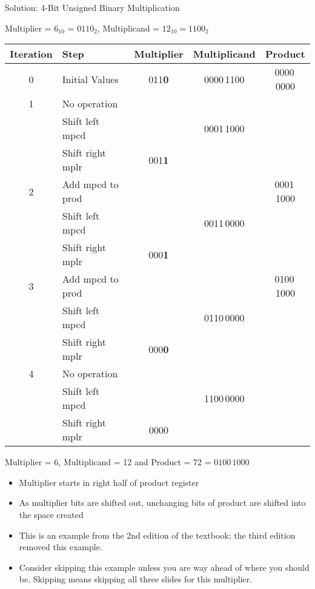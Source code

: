 \ifnum{}
\begin{frame}{Solution: 4-Bit Unsigned Binary Multiplication}

Multiplier = $6_{10}$ = $0110_2$, Multiplicand = $12_{10} = 1100_2$

\begin{tabular}{|c|l|c|c|c|} \hline
Iteration & Step & Multiplier & Multiplicand & Product \\ \hline
0 & Initial Values   & {\color{red}011\textbf{0}} & 0000\,{\color{blue}1100}  & 0000\,0000 \\ \hline
1 & No operation     &      &             & \\%
  & Shift left mpcd  &      & 000{\color{blue}1\,100}0  &          \\
  & Shift right mplr & 0{\color{red}01\textbf{1}} &             &          \\ \hline
2 & Add mpcd to prod &      &             & 0001\,1000 \\
  & Shift left mpcd  &      & 00{\color{blue}11\,00}00  &          \\
  & Shift right mplr & 00{\color{red}0\textbf{1}} &             &          \\ \hline
3 & Add mpcd to prod     &      &             &     0100\,1000     \\
  & Shift left mpcd  &      & 0{\color{blue}110\,0}000  &          \\
  & Shift right mplr & 000{\color{red}\textbf{0}} &             &          \\ \hline
4 & No operation &      &             &  \\
  & Shift left mpcd  &      & {\color{blue}1100}\,0000  &          \\
  & Shift right mplr & 0000 &             &          \\ \hline
\end{tabular}

Multiplier = 6, Multiplicand = 12 and Product = 72 = $0100\,1000$
\end{frame}
\fi


\begin{frame}[fragile]
\begin{itemize}
\item Multiplier starts in right half of product register
\item As multiplier bits are shifted out, unchanging bits of product
are shifted into the space created
\end{itemize}
\BNotes\ifnum{}
\begin{itemize}
\item This is an example from the 2nd edition of the textbook; 
	the third edition removed this example.
\item Consider skipping this example unless you are way ahead of where
	you should be.  Skipping means skipping all three slides for
	this multiplier.
\end{itemize}
\fi\ENotes
\end{frame}

